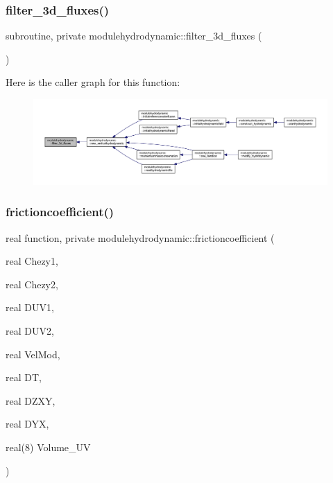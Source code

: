 \subsubsection{\texorpdfstring{filter\+\_\+3d\+\_\+fluxes()}{filter\_3d\_fluxes()}}
{\footnotesize\ttfamily subroutine, private modulehydrodynamic\+::filter\+\_\+3d\+\_\+fluxes (\begin{DoxyParamCaption}{ }\end{DoxyParamCaption})\hspace{0.3cm}{\ttfamily [private]}}

Here is the caller graph for this function\+:\nopagebreak
\begin{figure}[H]
\begin{center}
\leavevmode
\includegraphics[width=350pt]{namespacemodulehydrodynamic_a9de56e052f0a5f85cbbcbac9a2f0f95a_icgraph}
\end{center}
\end{figure}
\mbox{\label{namespacemodulehydrodynamic_aa1565fcf41a2baafe5216a3a1a3a963f}} 
\subsubsection{\texorpdfstring{frictioncoefficient()}{frictioncoefficient()}}
{\footnotesize\ttfamily real function, private modulehydrodynamic\+::frictioncoefficient (\begin{DoxyParamCaption}\item[{real}]{Chezy1,  }\item[{real}]{Chezy2,  }\item[{real}]{D\+U\+V1,  }\item[{real}]{D\+U\+V2,  }\item[{real}]{Vel\+Mod,  }\item[{real}]{DT,  }\item[{real}]{D\+Z\+XY,  }\item[{real}]{D\+YX,  }\item[{real(8)}]{Volume\+\_\+\+UV }\end{DoxyParamCaption})\hspace{0.3cm}{\ttfamily [private]}}

